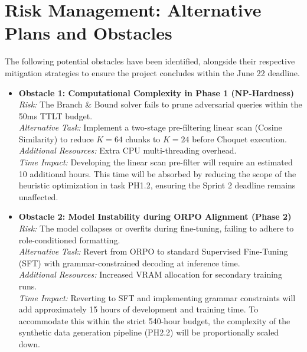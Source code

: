 \section{Risk Management: Alternative Plans and Obstacles}
\label{sec:risk-management-alternative-plans-and-obstacles}

The following potential obstacles have been identified, alongside their respective mitigation strategies to ensure the project concludes within the June 22 deadline.

\begin{itemize}
    \item \textbf{Obstacle 1: Computational Complexity in Phase 1 (NP-Hardness)} \\
    \textit{Risk:} The Branch \& Bound solver fails to prune adversarial queries within the 50ms TTLT budget. \\
    \textit{Alternative Task:} Implement a two-stage pre-filtering linear scan (Cosine Similarity) to reduce $K=64$ chunks to $K=24$ before Choquet execution. \\
    \textit{Additional Resources:} Extra CPU multi-threading overhead. \\
    \textit{Time Impact:} Developing the linear scan pre-filter will require an estimated 10 additional hours. This time will be absorbed by reducing the scope of the heuristic optimization in task PH1.2, ensuring the Sprint 2 deadline remains unaffected.

    \item \textbf{Obstacle 2: Model Instability during ORPO Alignment (Phase 2)} \\
    \textit{Risk:} The model collapses or overfits during fine-tuning, failing to adhere to role-conditioned formatting. \\
    \textit{Alternative Task:} Revert from ORPO to standard Supervised Fine-Tuning (SFT) with grammar-constrained decoding at inference time. \\
    \textit{Additional Resources:} Increased VRAM allocation for secondary training runs. \\
    \textit{Time Impact:} Reverting to SFT and implementing grammar constraints will add approximately 15 hours of development and training time. To accommodate this within the strict 540-hour budget, the complexity of the synthetic data generation pipeline (PH2.2) will be proportionally scaled down.


\end{itemize}
